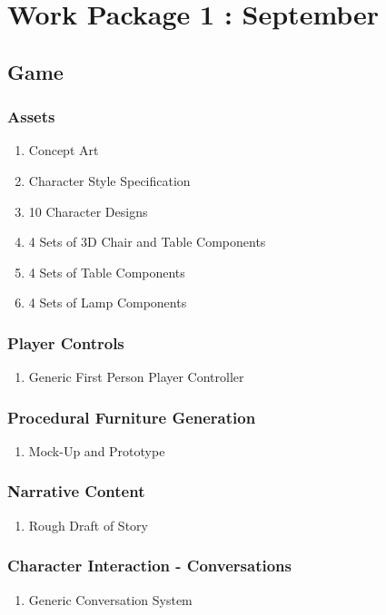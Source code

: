 \section{Work Package 1 : September}
\subsection{Game}
\subsubsection{Assets}
\begin{enumerate}
\item Concept Art
\item Character Style Specification
\item 10 Character Designs
\item 4 Sets of 3D Chair and Table Components
\item 4 Sets of Table Components
\item 4 Sets of Lamp Components
\end{enumerate}
\subsubsection{Player Controls}
\begin{enumerate}
\item Generic First Person Player Controller
\end{enumerate}
\subsubsection{Procedural Furniture Generation}
\begin{enumerate}
\item Mock-Up and Prototype
\end{enumerate}
\subsubsection{Narrative Content}
\begin{enumerate}
\item Rough Draft of Story
\end{enumerate}
\subsubsection{Character Interaction - Conversations}
\begin{enumerate}
\item Generic Conversation System
\end{enumerate}
